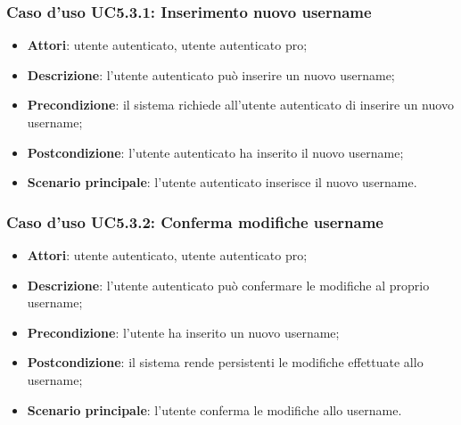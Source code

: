 \subsubsection{Caso d'uso UC5.3.1: Inserimento nuovo username}

\begin{itemize}
	\item \textbf{Attori}: utente autenticato, utente autenticato pro;
	\item \textbf{Descrizione}: l'utente autenticato può inserire un nuovo username;
	\item \textbf{Precondizione}: il sistema richiede all'utente autenticato di inserire un nuovo username;
	\item \textbf{Postcondizione}: l'utente autenticato ha inserito il nuovo username;
	\item \textbf{Scenario principale}: l'utente autenticato inserisce il nuovo username.
\end{itemize}

\subsubsection{Caso d'uso UC5.3.2: Conferma modifiche username}

\begin{itemize}
	\item \textbf{Attori}: utente autenticato, utente autenticato pro;
	\item \textbf{Descrizione}: l'utente autenticato può confermare le modifiche al proprio username;
	\item \textbf{Precondizione}: l'utente ha inserito un nuovo username;
	\item \textbf{Postcondizione}: il sistema rende persistenti le modifiche effettuate allo username;
	\item \textbf{Scenario principale}: l'utente conferma le modifiche allo username.
\end{itemize}

